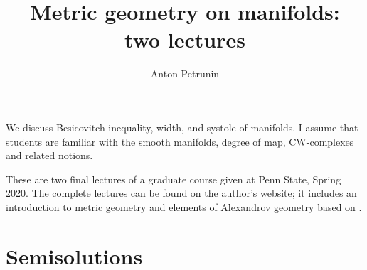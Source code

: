 \documentclass[twoside]{book}
\begin{document}
 
\title{Metric geometry on manifolds:
\\ two lectures}
\author{Anton Petrunin}
\date{}
\maketitle

We discuss Besicovitch inequality, width, and systole of manifolds.
I assume that students are familiar with the smooth manifolds, degree of map, CW-complexes and related notions.

These are two final lectures of a graduate course given at Penn State, Spring 2020.
The complete lectures can be found on the author's website;
it includes an introduction to metric geometry \cite{petrunin2020pure}
and elements of Alexandrov geometry based on \cite{alexander-kapovitch-petrunin-2019}.

\thispagestyle{empty}
\tableofcontents
\thispagestyle{empty}

%



%
%
%
\appendix
\chapter{Semisolutions}


%
{\small\sloppy


\printbibliography[heading=bibintoc]
\fussy
}
\end{document}
